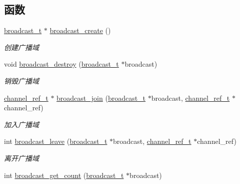 \subsection*{函数}
\begin{DoxyCompactItemize}
\item 
\hyperlink{a00044_ac970c5deaf6417a866aabed01cd57b1b_ac970c5deaf6417a866aabed01cd57b1b}{broadcast\+\_\+t} $\ast$ \hyperlink{a00083_gaa3b09fb6ff3281cb10736c0aabac18fc_gaa3b09fb6ff3281cb10736c0aabac18fc}{broadcast\+\_\+create} ()
\begin{DoxyCompactList}\small\item\em 创建广播域 \end{DoxyCompactList}\item 
void \hyperlink{a00083_gaa28451fa4656633ded0c7b966ff159c3_gaa28451fa4656633ded0c7b966ff159c3}{broadcast\+\_\+destroy} (\hyperlink{a00044_ac970c5deaf6417a866aabed01cd57b1b_ac970c5deaf6417a866aabed01cd57b1b}{broadcast\+\_\+t} $\ast$broadcast)
\begin{DoxyCompactList}\small\item\em 销毁广播域 \end{DoxyCompactList}\item 
\hyperlink{a00044_a151271c9d188ef28d4d24bb81dcc1263_a151271c9d188ef28d4d24bb81dcc1263}{channel\+\_\+ref\+\_\+t} $\ast$ \hyperlink{a00083_ga1c736809a1d0e4b7c77b617ac8ce590d_ga1c736809a1d0e4b7c77b617ac8ce590d}{broadcast\+\_\+join} (\hyperlink{a00044_ac970c5deaf6417a866aabed01cd57b1b_ac970c5deaf6417a866aabed01cd57b1b}{broadcast\+\_\+t} $\ast$broadcast, \hyperlink{a00044_a151271c9d188ef28d4d24bb81dcc1263_a151271c9d188ef28d4d24bb81dcc1263}{channel\+\_\+ref\+\_\+t} $\ast$channel\+\_\+ref)
\begin{DoxyCompactList}\small\item\em 加入广播域 \end{DoxyCompactList}\item 
int \hyperlink{a00083_gad846ced37d33b750f61a88565eaed9a4_gad846ced37d33b750f61a88565eaed9a4}{broadcast\+\_\+leave} (\hyperlink{a00044_ac970c5deaf6417a866aabed01cd57b1b_ac970c5deaf6417a866aabed01cd57b1b}{broadcast\+\_\+t} $\ast$broadcast, \hyperlink{a00044_a151271c9d188ef28d4d24bb81dcc1263_a151271c9d188ef28d4d24bb81dcc1263}{channel\+\_\+ref\+\_\+t} $\ast$channel\+\_\+ref)
\begin{DoxyCompactList}\small\item\em 离开广播域 \end{DoxyCompactList}\item 
int \hyperlink{a00083_gacd045b1ca8be7fa8fac6e337934acc97_gacd045b1ca8be7fa8fac6e337934acc97}{broadcast\+\_\+get\+\_\+count} (\hyperlink{a00044_ac970c5deaf6417a866aabed01cd57b1b_ac970c5deaf6417a866aabed01cd57b1b}{broadcast\+\_\+t} $\ast$broadcast)

\end{DoxyCompactItemize}
